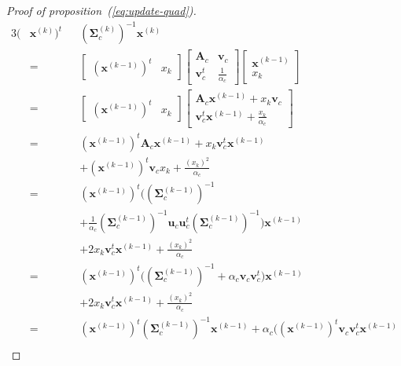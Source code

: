 \documentclass[journal,peerreview,onecolumn]{IEEEtran}
\begin{document}
\begin{proof}[Proof of proposition~(\ref{eq:update-quad})]
    \begin{alignat*}{3}
    (&\mathbf{x}^{(k)})^t && (\boldsymbol{\Sigma}^{(k)}_c)^{-1} \mathbf{x}^{(k)} \\
     &= &&\left[\begin{array}{cc} (\mathbf{x}^{(k-1)})^t   & x_k \end{array}\right]
        \left[\begin{array}{cc}
            \mathbf{A}_c   & \mathbf{v}_c \\
            \mathbf{v}_c^t & \frac{1}{\alpha_c}
        \end{array}\right]
        \left[\begin{array}{c} \mathbf{x}^{(k-1)} \\ x_k \end{array}\right] \\
     &= &&\left[\begin{array}{cc} (\mathbf{x}^{(k-1)})^t   & x_k \end{array}\right]
            \left[\begin{array}{c} \mathbf{A}_c \mathbf{x}^{(k-1)} + x_k \mathbf{v}_c \\ \mathbf{v}_c^t \mathbf{x}^{(k-1)} + \frac{x_k}{\alpha_c} \end{array}\right] \\
     &= &&(\mathbf{x}^{(k-1)})^t \mathbf{A}_c \mathbf{x}^{(k-1)} + x_k \mathbf{v}_c^t \mathbf{x}^{(k-1)} \\
     & &&+ (\mathbf{x}^{(k-1)})^t \mathbf{v}_c x_k + \frac{(x_k)^2}{\alpha_c} \\
     &= &&(\mathbf{x}^{(k-1)})^t \Big((\boldsymbol{\Sigma}_c^{(k-1)})^{-1} \\
     & &&+ \frac{1}{\alpha_c} (\boldsymbol{\Sigma}_c^{(k-1)})^{-1} \mathbf{u}_c \mathbf{u}_c^t (\boldsymbol{\Sigma}_c^{(k-1)})^{-1}\Big) \mathbf{x}^{(k-1)}\\
     & &&+ 2 x_k \mathbf{v}_c^t \mathbf{x}^{(k-1)} + \frac{(x_k)^2}{\alpha_c} \\
     &= &&(\mathbf{x}^{(k-1)})^t \Big((\boldsymbol{\Sigma}_c^{(k-1)})^{-1} + \alpha_c \mathbf{v}_c \mathbf{v}_c^t\Big) \mathbf{x}^{(k-1)}\\
     & &&+ 2 x_k \mathbf{v}_c^t \mathbf{x}^{(k-1)} + \frac{(x_k)^2}{\alpha_c} \\
     &= &&(\mathbf{x}^{(k-1)})^t (\boldsymbol{\Sigma}_c^{(k-1)})^{-1} \mathbf{x}^{(k-1)} + \alpha_c \Big( (\mathbf{x}^{(k-1)})^t \mathbf{v}_c \mathbf{v}_c^t \mathbf{x}^{(k-1)} \\

\end{alignat*}
\end{proof}
\end{document}
